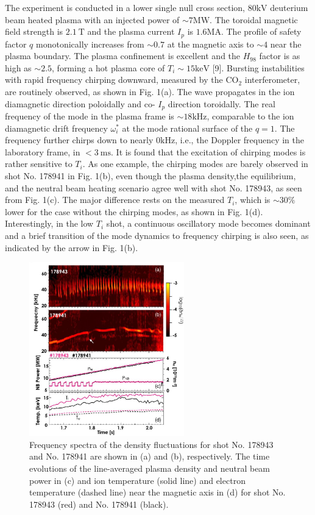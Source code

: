 \documentclass[oneside,onecolumn]{article}
\begin{document}
\begin{sloppypar}
 The experiment is conducted in a lower single null cross section, $80 \mathrm{kV}$ deuterium beam heated plasma with an injected power of $\sim 7 \mathrm{MW}$. The toroidal magnetic field strength is $2.1 \mathrm{~T}$ and the plasma current $I_{p}$ is $1.6 \mathrm{MA}$. The profile of safety factor $q$ monotonically increases from $\sim 0.7$ at the magnetic axis to $\sim 4$ near the plasma boundary. The plasma confinement is excellent and the $H_{98}$ factor is as high as $\sim 2.5$, forming a hot plasma core of $T_{i} \sim 15 \mathrm{keV}$ [9]. Bursting instabilities with rapid frequency chirping downward, measured by the $\mathrm{CO}_{2}$ interferometer, are routinely observed, as shown in Fig. 1(a). The wave propagates in the ion diamagnetic direction poloidally and co- $I_{p}$ direction toroidally. The real frequency of the mode in the plasma frame is $\sim 18 \mathrm{kHz}$, comparable to the ion diamagnetic drift frequency $\omega_{i}^{*}$ at the mode rational surface of the $q=1$. The frequency further chirps down to nearly $0 \mathrm{kHz}$, i.e., the Doppler frequency in the laboratory frame, in $<3 \mathrm{~ms}$. It is found that the excitation of chirping modes is rather sensitive to $T_{i}$. As one example, the chirping modes are barely observed in shot No. 178941 in Fig. 1(b), even though the plasma density,the equilibrium, and the neutral beam heating scenario agree well with shot No. 178943, as seen from Fig. 1(c). The major difference rests on the measured $T_{i}$, which is $\sim 30 \%$ lower for the case without the chirping modes, as shown in Fig. 1(d). Interestingly, in the low $T_{i}$ shot, a continuous oscillatory mode becomes dominant and a brief transition of the mode dynamics to frequency chirping is also seen, as indicated by the arrow in Fig. 1(b).
 
 \begin{figure}[htbp]
 	\centering
 	\includegraphics[max width=0.6\textwidth,max height=1.0\textheight]{2023_06_19_f8dbb752866ca158c73eg-2(1)}
 	\caption{Frequency spectra of the density fluctuations for shot No. 178943 and No. 178941 are shown in (a) and (b), respectively. The time evolutions of the line-averaged plasma density and neutral beam power in (c) and ion temperature (solid line) and electron temperature (dashed line) near the magnetic axis in (d) for shot No. 178943 (red) and No. 178941 (black).}
 	\label{figure1}
 \end{figure}
 

\end{sloppypar}
\end{document}
